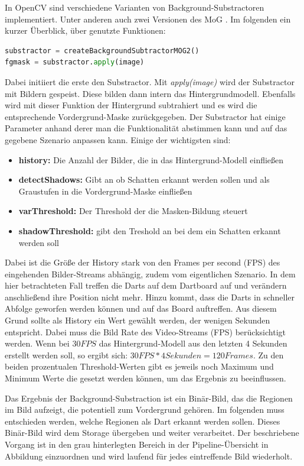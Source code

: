 In OpenCV sind verschiedene Varianten von Background-Substractoren implementiert. Unter anderen auch zwei Versionen des MoG \autocite{OpenCVBack2016}. Im folgenden ein kurzer Überblick, über genutzte Funktionen:
\begin{lstlisting}[frame=single,language=Python]
substractor = createBackgroundSubtractorMOG2()
fgmask = substractor.apply(image)
\end{lstlisting}
Dabei initiiert die erste den Substractor.
Mit \textit{apply(image)} wird der Substractor mit Bildern gespeist. Diese bilden dann intern das Hintergrundmodell. Ebenfalls wird mit dieser Funktion der Hintergrund subtrahiert und es wird die entsprechende Vordergrund-Maske zurückgegeben. 
Der Substractor hat einige Parameter anhand derer man die Funktionalität abstimmen kann und auf das gegebene Szenario anpassen kann. Einige der wichtigsten sind:
\begin{itemize}
	\item \textbf{history:} Die Anzahl der Bilder, die in das Hintergrund-Modell einfließen
	\item \textbf{detectShadows:} Gibt an ob Schatten erkannt werden sollen und als Graustufen in die Vordergrund-Maske einfließen
	\item \textbf{varThreshold:} Der Threshold der die Masken-Bildung steuert
	\item \textbf{shadowThreshold:} gibt den Treshold an bei dem ein Schatten erkannt werden soll
\end{itemize}
Dabei ist die Größe der History stark von den Frames per second (FPS) des eingehenden Bilder-Streams abhängig, zudem vom eigentlichen Szenario. In dem hier betrachteten Fall treffen die Darts auf dem Dartboard auf und verändern anschließend ihre Position nicht mehr. Hinzu kommt, dass die Darts in schneller Abfolge geworfen werden können und auf das Board auftreffen. 
Aus diesem Grund sollte als History ein Wert gewählt werden, der wenigen Sekunden entspricht. Dabei muss die Bild Rate des Video-Streams (FPS) berücksichtigt werden. Wenn bei $30FPS$ das Hintergrund-Modell aus den letzten 4 Sekunden erstellt werden soll, so ergibt sich: $30FPS * 4 Sekunden = 120 Frames$.
Zu den beiden prozentualen Threshold-Werten gibt es jeweils noch Maximum und Minimum Werte die gesetzt werden können, um das Ergebnis zu beeinflussen.

Das Ergebnis der Background-Substraction ist ein Binär-Bild, das die Regionen im Bild aufzeigt, die potentiell zum Vordergrund gehören. Im folgenden muss entschieden werden, welche Regionen als Dart erkannt werden sollen. Dieses Binär-Bild wird dem Storage übergeben und weiter verarbeitet. Der beschriebene Vorgang ist in den grau hinterlegten Bereich in der Pipeline-Übersicht in Abbildung einzuordnen und wird laufend für jedes eintreffende Bild wiederholt.



